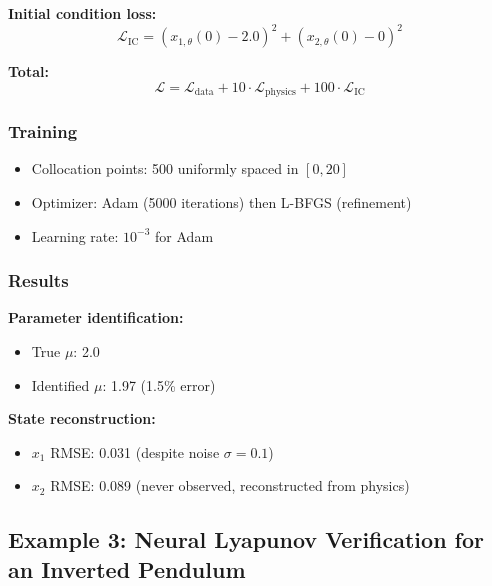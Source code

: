 \textbf{Initial condition loss:}
\begin{equation}
\mathcal{L}_{\text{IC}} = (x_{1,\theta}(0) - 2.0)^2 + (x_{2,\theta}(0) - 0)^2
\end{equation}

\textbf{Total:}
\begin{equation}
\mathcal{L} = \mathcal{L}_{\text{data}} + 10 \cdot \mathcal{L}_{\text{physics}} + 100 \cdot \mathcal{L}_{\text{IC}}
\end{equation}

\subsubsection{Training}

\begin{itemize}
    \item Collocation points: 500 uniformly spaced in $[0, 20]$
    \item Optimizer: Adam (5000 iterations) then L-BFGS (refinement)
    \item Learning rate: $10^{-3}$ for Adam
\end{itemize}

\subsubsection{Results}

\textbf{Parameter identification:}
\begin{itemize}
    \item True $\mu$: 2.0
    \item Identified $\mu$: 1.97 (1.5\% error)
\end{itemize}

\textbf{State reconstruction:}
\begin{itemize}
    \item $x_1$ RMSE: 0.031 (despite noise $\sigma = 0.1$)
    \item $x_2$ RMSE: 0.089 (never observed, reconstructed from physics)
\end{itemize}


\subsection{Example 3: Neural Lyapunov Verification for an Inverted Pendulum}
\label{ex:neural_lyapunov}

